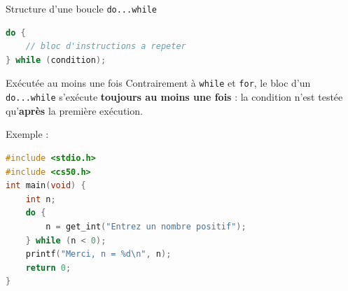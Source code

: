 \begin{UPSTIinfor}{Structure d'une boucle \texttt{do...while}}
  \begin{lstlisting}[language=c]
do {
    // bloc d'instructions a repeter
} while (condition);
\end{lstlisting}
\end{UPSTIinfor}

\begin{UPSTIwarning}{Exécutée au moins une fois}
  Contrairement à \texttt{while} et \texttt{for}, le bloc d'un \texttt{do...while} s'exécute \textbf{toujours au moins une fois} : la condition n'est testée qu'\textbf{après} la première exécution.
\end{UPSTIwarning}

Exemple :

\begin{lstlisting}[language=c, caption={Validation de saisie}]
#include <stdio.h>
#include <cs50.h>
int main(void) {
    int n;
    do {
        n = get_int("Entrez un nombre positif");
    } while (n < 0);
    printf("Merci, n = %d\n", n);
    return 0;
}
\end{lstlisting}








